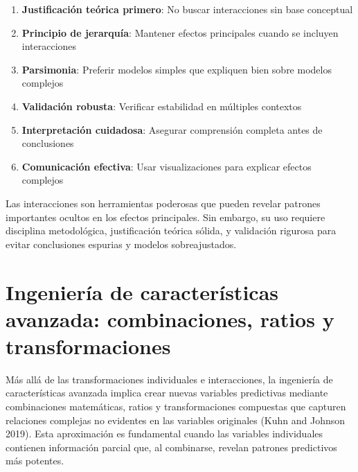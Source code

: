\documentclass[
  letterpaper,
  DIV=11,
  numbers=noendperiod]{scrreprt}
\providecommand{\tightlist}{%
  \setlength{\itemsep}{0pt}\setlength{\parskip}{0pt}}
\begin{document}
\begin{tcolorbox}[enhanced jigsaw, leftrule=.75mm, breakable, colbacktitle=quarto-callout-important-color!10!white, bottomrule=.15mm, colframe=quarto-callout-important-color-frame, toprule=.15mm, colback=white, coltitle=black, bottomtitle=1mm, left=2mm, title=\textcolor{quarto-callout-important-color}{\faExclamation}\hspace{0.5em}{Principios para el uso de interacciones}, opacityback=0, arc=.35mm, opacitybacktitle=0.6, toptitle=1mm, titlerule=0mm, rightrule=.15mm]

\begin{enumerate}
\def\labelenumi{\arabic{enumi}.}
\tightlist
\item
  \textbf{Justificación teórica primero}: No buscar interacciones sin
  base conceptual
\item
  \textbf{Principio de jerarquía}: Mantener efectos principales cuando
  se incluyen interacciones
\item
  \textbf{Parsimonia}: Preferir modelos simples que expliquen bien sobre
  modelos complejos
\item
  \textbf{Validación robusta}: Verificar estabilidad en múltiples
  contextos
\item
  \textbf{Interpretación cuidadosa}: Asegurar comprensión completa antes
  de conclusiones
\item
  \textbf{Comunicación efectiva}: Usar visualizaciones para explicar
  efectos complejos
\end{enumerate}

\end{tcolorbox}

Las interacciones son herramientas poderosas que pueden revelar patrones
importantes ocultos en los efectos principales. Sin embargo, su uso
requiere disciplina metodológica, justificación teórica sólida, y
validación rigurosa para evitar conclusiones espurias y modelos
sobreajustados.

\section{Ingeniería de características avanzada: combinaciones, ratios y
transformaciones}\label{ingenieruxeda-de-caracteruxedsticas-avanzada-combinaciones-ratios-y-transformaciones}

Más allá de las transformaciones individuales e interacciones, la
ingeniería de características avanzada implica crear nuevas variables
predictivas mediante combinaciones matemáticas, ratios y
transformaciones compuestas que capturen relaciones complejas no
evidentes en las variables originales (Kuhn and Johnson 2019). Esta
aproximación es fundamental cuando las variables individuales contienen
información parcial que, al combinarse, revelan patrones predictivos más
potentes.
\end{document}
